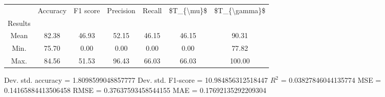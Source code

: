 \begin{tabular}{|c|c|c|c|c|c|c|}
\toprule
{} &  Accuracy &  F1 score &  Precision &  Recall &  \$T\_\{\textbackslash mu\}\$ &  \$T\_\{\textbackslash gamma\}\$ \\
Results &           &           &            &         &            &               \\
\hline
Mean    &     82.38 &     46.93 &      52.15 &   46.15 &      46.15 &         90.31 \\
Min.    &     75.70 &      0.00 &       0.00 &    0.00 &       0.00 &         77.82 \\
Max.    &     84.56 &     51.53 &      96.43 &   66.03 &      66.03 &        100.00 \\
\bottomrule
\end{tabular}

 Dev. std. accuracy = 1.8098599048857777
 Dev. std. F1-score = 10.984856312518447
 $R^2$ = 0.03827846044135774
 MSE = 0.14165884413506458
 RMSE = 0.37637593458544155
 MAE = 0.17692135292209304